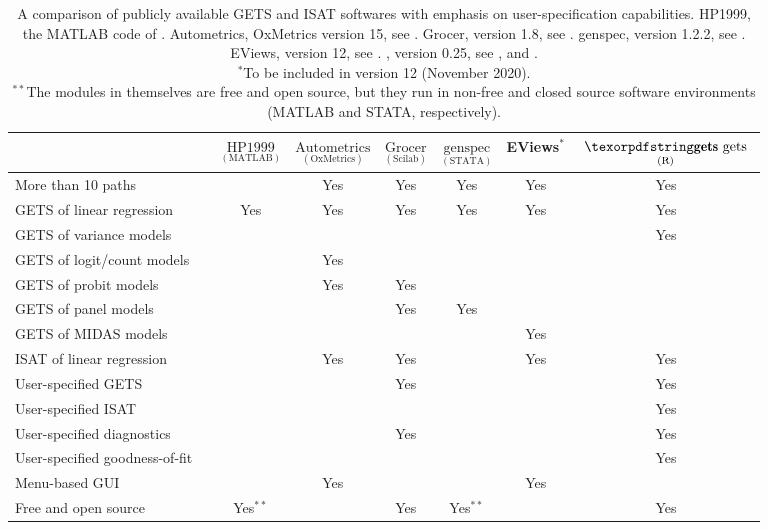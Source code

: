 \begin{table}[t!]
	\centering
	\setlength{\tabcolsep}{3pt} %
	\begin{tabular}{lccccccc}
		\toprule
		& & $\underset{(\text{MATLAB})}{\text{HP1999}}$ &  $\underset{(\text{OxMetrics})}{\text{Autometrics}}$ & $\underset{(\text{Scilab})}{\text{Grocer}}$ & $\underset{(\text{STATA})}{ \text{genspec} }$ & EViews$^*$ & $\underset{(\text{R})}{ \text{ \pkg{gets} } }$ \\
		\midrule
		More than 10 paths & & & Yes & Yes & Yes & Yes & Yes \\[1mm] 
		GETS of linear regression & & Yes & Yes & Yes & Yes & Yes & Yes \\[1mm]
		GETS of variance models & & & & & & & Yes \\[1mm]
		GETS of logit/count models & & & Yes & & & & \\[1mm]
		GETS of probit models & & & Yes & Yes & & & \\[1mm]
		GETS of panel models & & & & Yes & Yes & & \\[1mm]
		GETS of MIDAS models & & & & & & Yes & \\[1mm]
		ISAT of linear regression & & & Yes & Yes & & Yes & Yes \\[1mm]
		User-specified GETS & &  &  & Yes & & & Yes \\[1mm]
		User-specified ISAT &  &  &  & & & & Yes \\[1mm]
		User-specified diagnostics &  & & & Yes & & & Yes \\[1mm]
		User-specified goodness-of-fit & & & & & & & Yes \\[1mm]
		Menu-based GUI &  & & Yes & & & Yes & \\[1mm]		
		Free and open source & & Yes$^{**}$ & & Yes & Yes$^{**}$ & & Yes \\[1mm]
		\bottomrule
	\end{tabular}\\
	\caption{
		\label{table:software:comparison}
		A comparison of publicly available GETS and ISAT softwares with emphasis on user-specification capabilities. HP1999, the MATLAB code of \citet{Hooveretal99}. Autometrics, OxMetrics version 15, see \citet{DoornikHendry2018}. Grocer, version 1.8, see \citet{DuboisMichaux2019}. genspec, version 1.2.2, see \citet{Clarke2014}. EViews, version 12, see \citet{EViews2020}. , version 0.25, see \cite{SucarratKurlePretisReadeSchwarz2020getsV025}, and \citet{PretisReadeSucarrat2018}.\\
		$^{*}$To be included in version 12 (November 2020).\\
		$^{**}$The modules in themselves are free and open source, but they run in non-free and closed source software environments (MATLAB and STATA, respectively).
	}
\end{table}

